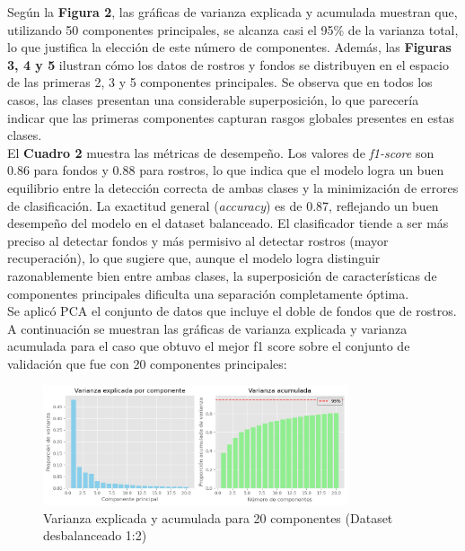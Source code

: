 \documentclass{article}
\begin{document}
Según la \textbf{Figura 2}, las gráficas de varianza explicada y acumulada muestran que, utilizando 50 componentes principales, se alcanza casi el 95\% de la varianza total, lo que justifica la elección de este número de componentes. Además, las \textbf{Figuras 3, 4 y 5} ilustran cómo los datos de rostros y fondos se distribuyen en el espacio de las primeras 2, 3 y 5 componentes principales. Se observa que en todos los casos, las clases presentan una considerable superposición, lo que parecería indicar que las primeras componentes capturan rasgos globales presentes en estas clases.\\

El \textbf{Cuadro 2} muestra las métricas de desempeño. Los valores de \textit{f1-score} son 0.86 para fondos y 0.88 para rostros, lo que indica que el modelo logra un buen equilibrio entre la detección correcta de ambas clases y la minimización de errores de clasificación. La exactitud general (\textit{accuracy}) es de 0.87, reflejando un buen desempeño del modelo en el dataset balanceado. El clasificador tiende a ser más preciso al detectar fondos y más permisivo al detectar rostros (mayor recuperación), lo que sugiere que, aunque el modelo logra distinguir razonablemente bien entre ambas clases, la superposición de características de componentes principales dificulta una separación completamente óptima.\\



Se aplicó PCA el conjunto de datos que incluye el doble de fondos que de rostros. A continuación se muestran las gráficas de varianza explicada y varianza acumulada para el caso que obtuvo el mejor f1 score sobre el conjunto de validación que fue con 20 componentes principales:

\begin{figure}[H]
    \centering
    \includegraphics[width=0.8\textwidth]{tarea_2/imagenes/variance_x2_v1_20.png}
    \caption{Varianza explicada y acumulada para 20 componentes (Dataset desbalanceado 1:2)}
    \label{fig:pca_componentes}
\end{figure}
\end{document}
